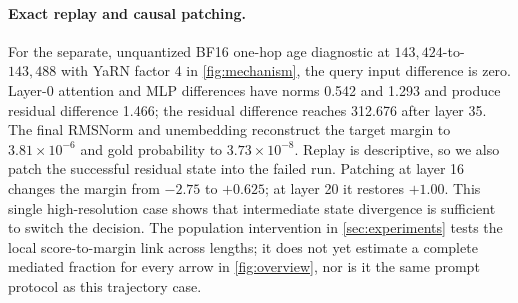 \paragraph{Exact replay and causal patching.}
For the separate, unquantized BF16 one-hop age diagnostic at
$143{,}424$-to-$143{,}488$ with YaRN factor 4 in \cref{fig:mechanism}, the query
input difference is zero.  Layer-0 attention and MLP differences have norms 0.542 and
1.293 and produce residual difference 1.466; the residual difference reaches
312.676 after layer 35.  The final RMSNorm and unembedding reconstruct the
target margin to $3.81\times10^{-6}$ and gold probability to
$3.73\times10^{-8}$.  Replay is descriptive, so we also patch the successful
residual state into the failed run.  Patching at layer 16 changes the margin
from $-2.75$ to $+0.625$; at layer 20 it restores $+1.00$.  This single
high-resolution case shows that intermediate state divergence is sufficient to
switch the decision.  The population intervention in \cref{sec:experiments}
tests the local score-to-margin link across lengths; it does not yet estimate a
complete mediated fraction for every arrow in \cref{fig:overview}, nor is it the
same prompt protocol as this trajectory case.
